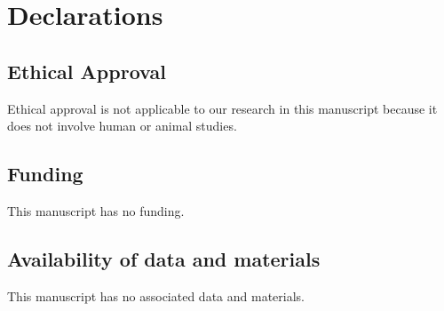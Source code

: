 \documentclass[12pt,letterpaper]{amsart}
\theoremstyle{definition}
\theoremstyle{remark}
\numberwithin{equation}{section}
\begin{document}
\section*{Declarations}
\subsection*{Ethical Approval}
Ethical approval is not applicable to our research in this manuscript because it does not involve human or animal studies.
\subsection*{Funding}
This manuscript has no funding.

\subsection*{Availability of data and materials }
This manuscript has no associated data and materials.
\end{document}
